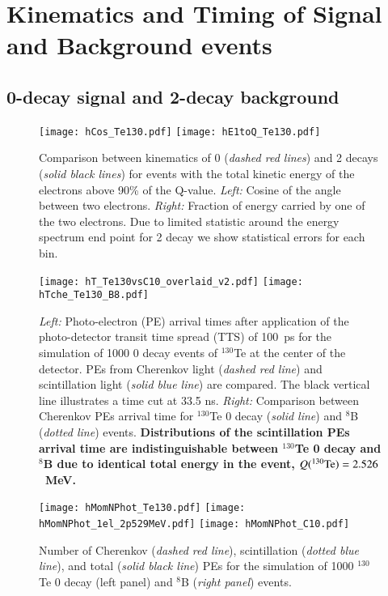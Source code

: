\section{Kinematics and Timing of Signal and Background events}


\subsection{0\nbb-decay signal and 2\nbb-decay background}

\begin{figure*}[ht]
  \centering
  \texttt{[image: hCos\_Te130.pdf]}
  \texttt{[image: hE1toQ\_Te130.pdf]}
  \caption{Comparison between kinematics of 0{\nbb} (\emph{dashed red
      lines}) and 2{\nbb} decays (\emph{solid black lines}) for events
    with the total kinetic energy of the electrons above 90\% of the
    Q-value. \emph{Left:} Cosine of the angle between two
    electrons. \emph{Right:} Fraction of energy carried by one of the
    two electrons. Due to limited statistic around the energy spectrum
    end point for 2{\nbb} decay we show statistical errors for each
    bin.}
  \label{fig:Kinematics}
\end{figure*}


\begin{figure*}[ht]
  \centering
  \texttt{[image: hT\_Te130vsC10\_overlaid\_v2.pdf]}
  \texttt{[image: hTche\_Te130\_B8.pdf]}
  \caption{\emph{Left:} Photo-electron (PE) arrival times after
    application of the photo-detector transit time spread (TTS) of
    100~ps for the simulation of 1000 0{\nbb} decay events of
    $^{130}$Te at the center of the detector. PEs from Cherenkov light
    (\emph{dashed red line}) and scintillation light (\emph{solid blue
      line}) are compared. The black vertical line illustrates a time
    cut at 33.5 ns. \emph{Right:} Comparison between Cherenkov PEs
    arrival time for $^{130}$Te {0\nbb} decay (\emph{solid line}) and
    $^{8}$B (\emph{dotted line}) events. {\bf Distributions of the
      scintillation PEs arrival time are indistinguishable between
      $^{130}$Te 0{\nbb} decay and $^8$B due to identical total energy
      in the event, $Q(^{130}{\rm Te})=2.526$~MeV.} }
\label{fig:ArrivalTimeDist}
\end{figure*}


\begin{figure*}[ht]
  \centering
  \texttt{[image: hMomNPhot\_Te130.pdf]}
  \texttt{[image: hMomNPhot\_1el\_2p529MeV.pdf]}
  \texttt{[image: hMomNPhot\_C10.pdf]}
  \caption{Number of Cherenkov (\emph{dashed red line}), scintillation
    (\emph{dotted blue line}), and total (\emph{solid black line}) PEs
    for the simulation of 1000 $^{130}$Te 0{\nbb} decay (left panel)
    and $^8$B (\emph{right panel}) events.}
\label{fig:NPhotDist}
\end{figure*}






